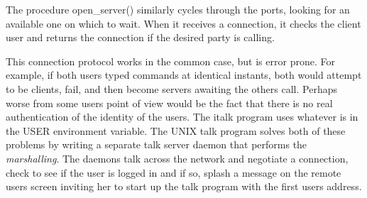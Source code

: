 The procedure \textsf{open\_server()} similarly cycles through the
ports, looking for an available one on which to wait. When it receives
a connection, it checks the client user and returns the connection if
the desired party is calling.


This connection protocol works in the common case, but is error prone.
For example, if both users typed commands at identical instants, both
would attempt to be clients, fail, and then become servers awaiting the
other{\textquotesingle}s call. Perhaps worse from some
users{\textquotesingle} point of view would be the fact that there is
no real authentication of the identity of the users. The \textsf{italk}
program uses whatever is in the USER environment variable. The UNIX talk program solves both
of these problems by writing a separate talk server daemon that
performs the \textit{marshalling}. The daemons talk across the network
and negotiate a connection, check to see if the user is logged in and
if so, splash a message on the remote user{\textquotesingle}s screen
inviting her to start up the talk program with the first
user{\textquotesingle}s address.

